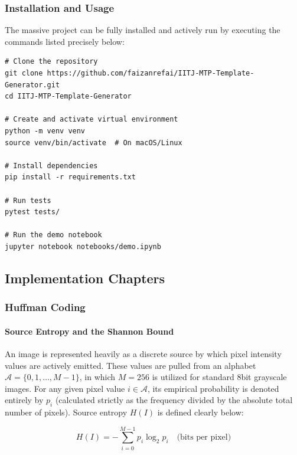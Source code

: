 \subsubsection{Installation and Usage}

The massive project can be fully installed and actively run by executing the commands listed precisely below:

\begin{verbatim}
# Clone the repository
git clone https://github.com/faizanrefai/IITJ-MTP-Template-Generator.git
cd IITJ-MTP-Template-Generator

# Create and activate virtual environment
python -m venv venv
source venv/bin/activate  # On macOS/Linux

# Install dependencies
pip install -r requirements.txt

# Run tests
pytest tests/

# Run the demo notebook
jupyter notebook notebooks/demo.ipynb
\end{verbatim}




\subsection{Implementation Chapters}

\subsubsection{Huffman Coding}


\paragraph{Source Entropy and the Shannon Bound}

An image is represented heavily as a discrete source by which pixel intensity values are actively emitted. These values are pulled from an alphabet $\mathcal{A} = \{0, 1, \dots, M-1\}$, in which $M = 256$ is utilized for standard 8bit grayscale images. For any given pixel value $i \in \mathcal{A}$, its empirical probability is denoted entirely by $p_i$ (calculated strictly as the frequency divided by the absolute total number of pixels). Source entropy $H(I)$ is defined clearly below:

\begin{equation}
    H(I) = -\sum_{i=0}^{M-1} p_i \log_{2} p_i \quad \text{(bits per pixel)}
\end{equation}

